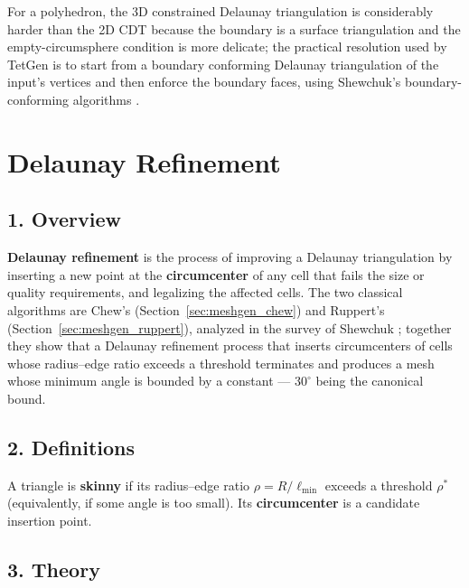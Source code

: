 For a polyhedron, the 3D constrained Delaunay triangulation is
considerably harder than the 2D CDT because the boundary is a surface
triangulation and the empty-circumsphere condition is more delicate; the
practical resolution used by TetGen \cite{si2015} is to start from a
boundary conforming Delaunay triangulation of the input's vertices and then
enforce the boundary faces, using Shewchuk's boundary-conforming algorithms
\cite{si2015}.


\section{Delaunay Refinement}
\label{sec:meshgen_refinement}

\subsection{1. Overview}

\textbf{Delaunay refinement} is the process of
improving a Delaunay triangulation by inserting a new point at the
\textbf{circumcenter} of any cell that fails the size or quality
requirements, and legalizing the affected cells. The two classical
algorithms are Chew's (Section~\ref{sec:meshgen_chew}) and Ruppert's
(Section~\ref{sec:meshgen_ruppert}), analyzed in the survey of Shewchuk
\cite{shewchuk2002}; together they show that a Delaunay refinement process
that inserts circumcenters of cells whose radius--edge ratio exceeds a
threshold terminates and produces a mesh whose minimum angle is bounded by
a constant --- $30^\circ$ being the canonical bound.

\subsection{2. Definitions}

\begin{definition}\label{def:meshgen_skinny}
  A triangle is \textbf{skinny} if its radius--edge ratio $\rho = R/\ell_{\min}$
  exceeds a threshold $\rho^*$ (equivalently, if some angle is too small).
  Its \textbf{circumcenter} is a candidate insertion point.
\end{definition}

\subsection{3. Theory}

